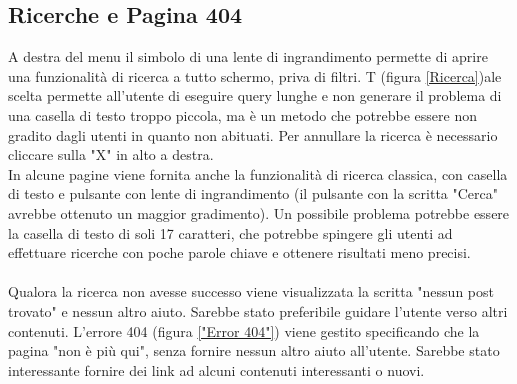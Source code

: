 \subsection{Ricerche e Pagina 404}

A destra del menu il simbolo di una lente di ingrandimento permette di aprire una funzionalità di ricerca a tutto schermo, priva di filtri. T (figura \ref{Ricerca})ale scelta permette all'utente di eseguire query lunghe e non generare il problema di una casella di testo troppo piccola, ma è un metodo che potrebbe essere non gradito dagli utenti in quanto non abituati. Per annullare la ricerca è necessario cliccare sulla "X" in alto a destra. \\
In alcune pagine viene fornita anche la funzionalità di ricerca classica, con casella di testo e pulsante con lente di ingrandimento (il pulsante con la scritta "Cerca" avrebbe ottenuto un maggior gradimento). Un possibile problema potrebbe essere la casella di testo di soli 17 caratteri, che potrebbe spingere gli utenti ad effettuare ricerche con poche parole chiave e ottenere risultati meno precisi.\\
\\
Qualora la ricerca non avesse successo viene visualizzata la scritta "nessun post trovato" e nessun altro aiuto. Sarebbe stato preferibile guidare l'utente verso altri contenuti.
L'errore 404 (figura \ref{"Error 404"}) viene gestito specificando che la pagina "non è più qui", senza fornire nessun altro aiuto all'utente. Sarebbe stato interessante fornire dei link ad alcuni contenuti interessanti o nuovi.
